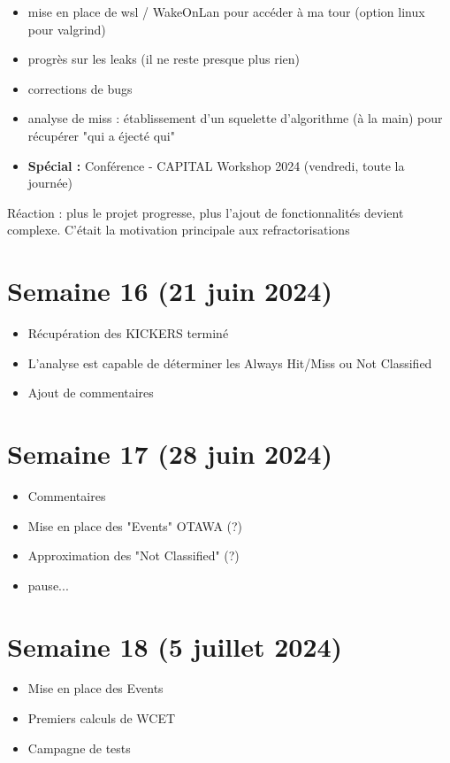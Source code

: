 \documentclass[a4paper,12pt]{article}
\begin{document}
\begin{itemize}
  \item mise en place de wsl / WakeOnLan pour accéder à ma tour (option linux pour valgrind)
  \item progrès sur les leaks (il ne reste presque plus rien)
  \item corrections de bugs
  \item analyse de miss : établissement d'un squelette d'algorithme (à la main) pour récupérer "qui a éjecté qui"
  \item \textbf{Spécial :} Conférence - CAPITAL Workshop 2024 (vendredi, toute la journée)
\end{itemize}

Réaction : plus le projet progresse, plus l'ajout de fonctionnalités devient complexe. C'était la motivation principale aux refractorisations

\section{Semaine 16 (21 juin 2024)}

\begin{itemize}
  \item Récupération des KICKERS terminé
  \item L'analyse est capable de déterminer les Always Hit/Miss ou Not Classified
  \item Ajout de commentaires
\end{itemize}

\section{Semaine 17 (28 juin 2024)}

\begin{itemize}
  \item Commentaires 
  \item Mise en place des "Events" OTAWA (?)
  \item Approximation des "Not Classified" (?)
  \item pause...
\end{itemize}

\section{Semaine 18 (5 juillet 2024)}

\begin{itemize}
  \item Mise en place des Events
  \item Premiers calculs de WCET
  \item Campagne de tests
\end{itemize}
\end{document}
